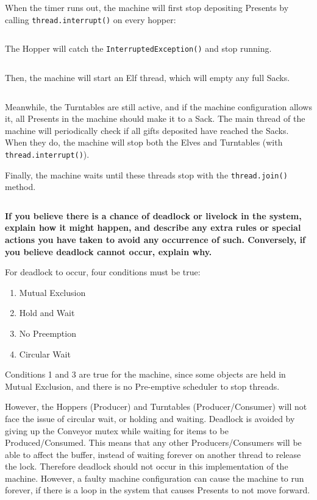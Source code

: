 \documentclass[a4paper,12pt]{article}
\begin{document}
    \noindent
    When the timer runs out, the machine will first stop depositing Presents by
    calling \texttt{thread.interrupt()} on every hopper:
    
    \inputminted[firstline=132, lastline=137, gobble=2]{java}{src/PresentSortingMachine.java}
   
    \noindent
    The Hopper will catch the \texttt{InterruptedException()} and stop running.

    \inputminted[gobble=14, firstline=172, lastline=176, breaklines]{java}{src/Hopper.java}

    \noindent
    Then, the machine will start an Elf thread, which will empty any full Sacks.
    
    \inputminted[firstline=30, lastline=33, gobble=10]{java}{src/Elf.java}
    
    \noindent
    Meanwhile, the Turntables are still active, and if the machine configuration
    allows it, all Presents in the machine should make it to a Sack.
    The main thread of the machine will periodically check if all gifts deposited
    have reached the Sacks. When they do, the machine will stop both the Elves
    and Turntables (with \texttt{thread.interrupt()}).
    
    \noindent
    Finally, the machine waits until these threads stop with the
    \texttt{thread.join()} method.
    
    \inputminted[firstline=152, lastline=162, gobble=2]{java}{src/PresentSortingMachine.java}
    
    \noindent
    \textbf{If you believe there is a chance of deadlock or livelock in the system,
    explain how it might happen, and describe any extra rules or special actions
    you have taken to avoid any occurrence of such.
    Conversely, if you believe deadlock cannot occur, explain why.\\}
    
    For deadlock to occur, four conditions must be true:
    \begin{enumerate}
     \item Mutual Exclusion
     \item Hold and Wait
     \item No Preemption
     \item Circular Wait
    \end{enumerate}
    
    \noindent
    Conditions 1 and 3 are true for the machine, since some objects
    are held in Mutual Exclusion, and there is no Pre-emptive scheduler to
    stop threads.
    
    \noindent
    However, the Hoppers (Producer) and Turntables (Producer/Consumer) will not
    face the issue of circular wait, or holding and waiting.
    Deadlock is avoided by giving up the Conveyor mutex while waiting for items
    to be Produced/Consumed.
    This means that any other Producers/Consumers will be able to affect the buffer,
    instead of waiting forever on another thread to release the lock.
    Therefore deadlock should not occur in this implementation of the machine.
    However, a faulty machine configuration can cause the machine to run forever,
    if there is a loop in the system that causes Presents to not move forward.
\end{document}
